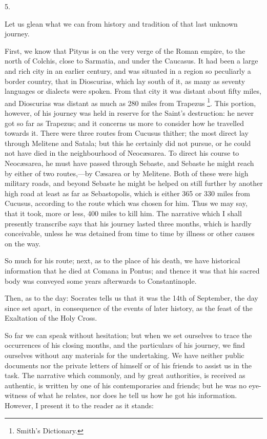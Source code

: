 5.

Let us glean what we can from history and tradition of that last
unknown journey.

First, we know that Pityus is on the very verge of the Roman
empire, to the north of Colchis, close to Sarmatia, and under the
Caucasus. It had been a large and rich city in an earlier century, and
was situated in a region so peculiarly a border country, that in
Dioscurias, which lay south of it, as many as seventy languages or
dialects were spoken. From that city it was distant about fifty miles,
and Dioscurias was distant as much as 280 miles from Trapezus \footnote{Smith's Dictionary.}. This portion, however, of his journey was held in reserve for
the Saint's destruction: he never got so far as Trapezus; and it
concerns us more to consider how he travelled towards it. There were
three routes from Cucusus thither; the most direct lay through
Melitene and Satala; but this he certainly did not pursue, or he could
not have died in the neighbourhood of Neocæsarea. To direct his
course to Neocæsarea, he must have passed through Sebaste, and
Sebaste he might reach by either of two routes,—by Cæsarea or by
Melitene. Both of these were high military roads, and beyond Sebaste
he might be helped on still further by another high road at least as
far as Sebastopolis, which is either 365 or 330 miles from Cucusus,
according to the route which was chosen for him. Thus we may
say, that it took, more or less, 400 miles to kill him. The narrative
which I shall presently transcribe says that his journey lasted three
months, which is hardly conceivable, unless he was detained from time
to time by illness or other causes on the way.

So much for his route; next, as to the place of his death, we have
historical information that he died at Comana in Pontus; and thence it
was that his sacred body was conveyed some years afterwards to
Constantinople.

Then, as to the day: Socrates tells us that it was the 14th of
September, the day since set apart, in consequence of the events of
later history, as the feast of the Exaltation of the Holy Cross.

So far we can speak without hesitation; but when we set ourselves
to trace the occurrences of his closing months, and the particulars of
his journey, we find ourselves without any materials for the
undertaking. We have neither public documents nor the private letters
of himself or of his friends to assist us in the task. The narrative
which commonly, and by great authorities, is received as authentic, is
written by one of his contemporaries and friends; but he was no
eye-witness of what he relates, nor does he tell us how he got his
information. However, I present it to the reader as it stands:

